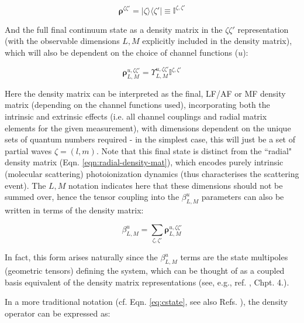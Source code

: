 \begin{equation}
\mathbf{\rho}^{\zeta\zeta'} = |\zeta\rangle\langle\zeta'| \equiv \mathbb{I}^{\zeta,\zeta'}
\end{equation}

And the full final continuum state as a density matrix in the $\zeta\zeta'$ representation (with the observable dimensions $L,M$ explicitly included in the density matrix), which will also be dependent on the choice of channel functions ($u$):

\begin{equation}
\mathbf{\rho}_{L,M}^{u,\zeta\zeta'}=\varUpsilon_{L,M}^{u,\zeta\zeta'}\mathbb{I}^{\zeta,\zeta'}
\end{equation}

Here the density matrix can be interpreted as the final, LF/AF or
MF density matrix (depending on the channel functions used), incorporating both the intrinsic and extrinsic
effects (i.e. all channel couplings and radial matrix elements for
the given measurement), with dimensions dependent on the unique sets of quantum numbers required - in the simplest case, this will just be a set of partial waves $\zeta = (l,m)$. Note that this final state is distinct from the ``radial" density matrix (Eqn. \ref{eqn:radial-density-mat}), which encodes purely intrinsic (molecular scattering) photoionization dynamics (thus characterises the scattering event). The $L,M$ notation indicates here that these dimensions should not be summed over, hence the tensor coupling into the $\beta_{L,M}^{u}$ parameters can also be written in terms of the density matrix:

\begin{equation}
\beta_{L,M}^{u}=\sum_{\zeta,\zeta'}\mathbf{\rho}_{L,M}^{u,\zeta\zeta'}
\end{equation}

In fact, this form arises naturally since the $\beta_{L,M}^{u}$ terms are the state multipoles (geometric tensors) defining the system, which can be thought of as a coupled basis equivalent of the density matrix representations (see, e.g., ref. \cite{BlumDensityMat}, Chpt. 4.).

In a more traditional notation (cf. Eqn. \ref{eq:cstate}, see also Refs. \cite{gregory2021MolecularFramePhotoelectron} 
), the density operator can be expressed as:



